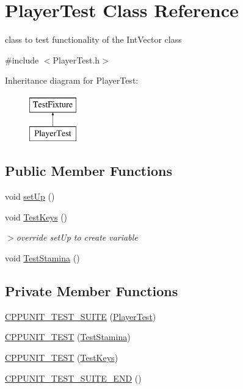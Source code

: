\hypertarget{classPlayerTest}{\section{Player\-Test Class Reference}
\label{classPlayerTest}
}


class to test functionality of the Int\-Vector class  




{\ttfamily \#include $<$Player\-Test.\-h$>$}

Inheritance diagram for Player\-Test\-:\begin{figure}[H]
\begin{center}
\leavevmode
\includegraphics[height=2.000000cm]{classPlayerTest}
\end{center}
\end{figure}
\subsection*{Public Member Functions}
\begin{DoxyCompactItemize}
\item 
void \hyperlink{classPlayerTest_a5fc4e3940fe2442cc760b12985ceef3b}{set\-Up} ()
\item 
void \hyperlink{classPlayerTest_af7b63b181271a7fa168cf73b0d85d346}{Test\-Keys} ()
\begin{DoxyCompactList}\small\item\em $>$override {\ttfamily set\-Up} to create variable \end{DoxyCompactList}\item 
void \hyperlink{classPlayerTest_af409ece08e5ae96a32d72377c9469807}{Test\-Stamina} ()
\end{DoxyCompactItemize}
\subsection*{Private Member Functions}
\begin{DoxyCompactItemize}
\item 
\hyperlink{classPlayerTest_a02dcdc23e12801f583826e13aa38609d}{C\-P\-P\-U\-N\-I\-T\-\_\-\-T\-E\-S\-T\-\_\-\-S\-U\-I\-T\-E} (\hyperlink{classPlayerTest}{Player\-Test})
\item 
\hyperlink{classPlayerTest_a69c4d0fdfb431a1d97cdec86462bc08f}{C\-P\-P\-U\-N\-I\-T\-\_\-\-T\-E\-S\-T} (\hyperlink{classPlayerTest_af409ece08e5ae96a32d72377c9469807}{Test\-Stamina})
\item 
\hyperlink{classPlayerTest_a0159eeaf95cc6bf3ddc352efd6049530}{C\-P\-P\-U\-N\-I\-T\-\_\-\-T\-E\-S\-T} (\hyperlink{classPlayerTest_af7b63b181271a7fa168cf73b0d85d346}{Test\-Keys})
\item 
\hyperlink{classPlayerTest_ae5022bed52c0af937d91f24e614d8ea6}{C\-P\-P\-U\-N\-I\-T\-\_\-\-T\-E\-S\-T\-\_\-\-S\-U\-I\-T\-E\-\_\-\-E\-N\-D} ()
\end{DoxyCompactItemize}
